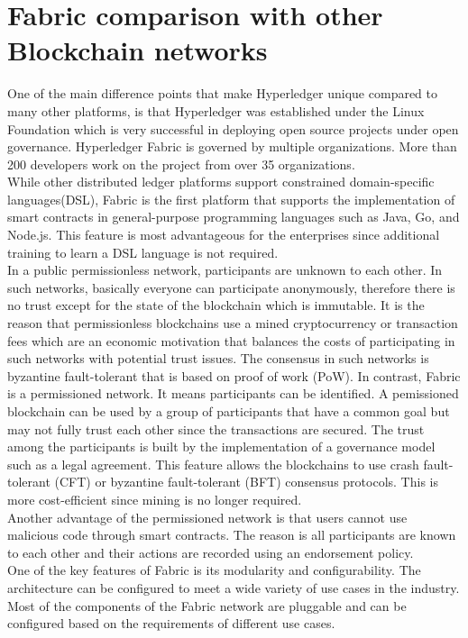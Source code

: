 \documentclass[sigconf,natbib=false]{acmart}
\begin{document}
    \section {Fabric comparison with other Blockchain networks}
    One of the main difference points that make Hyperledger unique compared to many other platforms, is that Hyperledger was established under the Linux Foundation which is very successful in deploying open source projects under open governance. Hyperledger Fabric is governed by multiple organizations. More than 200 developers work on the project from over 35 organizations.\\
    While other distributed ledger platforms support constrained domain-specific languages(DSL), Fabric is the first platform that supports the implementation of smart contracts in general-purpose programming languages such as Java, Go, and Node.js. This feature is most advantageous for the enterprises since additional training to learn a DSL language is not required.\\
    In a public permissionless network, participants are unknown to each other. In such networks, basically everyone can participate anonymously, therefore there is no trust except for the state of the blockchain which is immutable. It is the reason that permissionless blockchains use a mined cryptocurrency or transaction fees which are an economic motivation that balances the costs of participating in such networks with potential trust issues. The consensus in such networks is byzantine fault-tolerant that is based on proof of work (PoW). In contrast, Fabric is a permissioned network. It means participants can be identified. A pemissioned blockchain can be used by a group of participants that have a common goal but may not fully trust each other since the transactions are secured. The trust among the participants is built by the implementation of a governance model such as a legal agreement. This feature allows the blockchains to use crash fault-tolerant (CFT) or byzantine fault-tolerant (BFT) consensus protocols. This is more cost-efficient since mining is no longer required.\cite{hyperledgerIntroduction}\\
    Another advantage of the permissioned network is that users cannot use malicious code through smart contracts. The reason is all participants are known to each other and their actions are recorded using an endorsement policy.\\
    One of the key features of Fabric is its modularity and configurability. The architecture can be configured to meet a wide variety of use cases in the industry. Most of the components of the Fabric network are pluggable and can be configured based on the requirements of different use cases.
\end{document}
